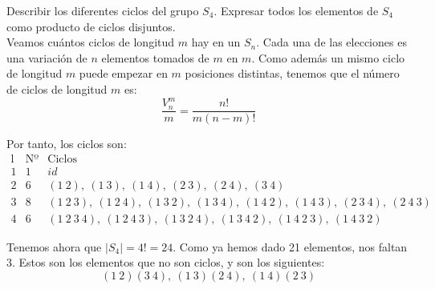 \begin{ejercicio}\label{ej:2.20}
    Describir los diferentes ciclos del grupo $S_4$. Expresar todos los elementos de $S_4$ como producto de ciclos disjuntos.\\

    Veamos cuántos ciclos de longitud $m$ hay en un $S_n$. Cada una de las elecciones es una variación de $n$ elementos tomados de $m$ en $m$. Como además un mismo ciclo de longitud $m$ puede empezar en $m$ posiciones distintas, tenemos que el número de ciclos de longitud $m$ es:
    \begin{equation*}
        \frac{V_n^m}{m}=\frac{n!}{m(n-m)!}
    \end{equation*}

    Por tanto, los ciclos son:
    \begin{equation*}
        \begin{array}{c|c|l}
            \text{l} & \text{Nº} & \text{Ciclos}\\\hline
            1 & 1 & id\\
            2 & 6 & (1\ 2),\ (1\ 3),\ (1\ 4),\ (2\ 3),\ (2\ 4),\ (3\ 4)\\
            3 & 8 & (1\ 2\ 3),\ (1\ 2\ 4),\ (1\ 3\ 2),\ (1\ 3\ 4),\ (1\ 4\ 2),\ (1\ 4\ 3),\ (2\ 3\ 4),\ (2\ 4\ 3)\\
            4 & 6 & (1\ 2\ 3\ 4),\ (1\ 2\ 4\ 3),\ (1\ 3\ 2\ 4),\ (1\ 3\ 4\ 2),\ (1\ 4\ 2\ 3),\ (1\ 4\ 3\ 2)
        \end{array}
    \end{equation*}

    Tenemos ahora que $|S_4|=4!=24$. Como ya hemos dado 21 elementos, nos faltan 3. Estos son los elementos que no son ciclos, y son los siguientes:
    \begin{equation*}
        (1\ 2)(3\ 4),\ (1\ 3)(2\ 4),\ (1\ 4)(2\ 3)
    \end{equation*}
\end{ejercicio}

